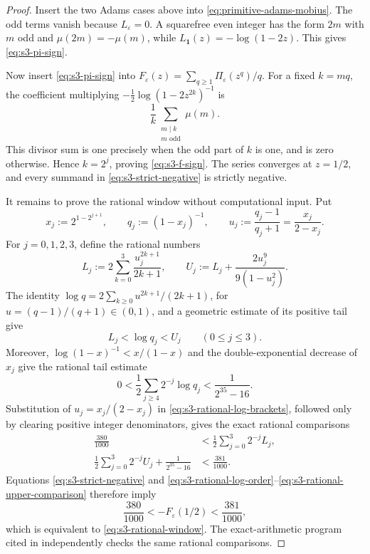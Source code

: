 \begin{proof}
Insert the two Adams cases above into
\eqref{eq:primitive-adams-mobius}.  The odd terms vanish because
\(L_\varepsilon=0\).  A squarefree even integer has the form \(2m\) with
\(m\) odd and \(\mu(2m)=-\mu(m)\), while
\(L_{\mathbf1}(z)=-\log(1-2z)\).  This gives
\eqref{eq:s3-pi-sign}.

Now insert \eqref{eq:s3-pi-sign} into
\(F_\varepsilon(z)=\sum_{q\geq1}\Pi_\varepsilon(z^q)/q\).  For a fixed
\(k=mq\), the coefficient multiplying
\(-\frac12\log(1-2z^{2k})^{-1}\) is
\[
  \frac1k\sum_{\substack{m\mid k\\m\text{ odd}}}\mu(m).
\]
This divisor sum is one precisely when the odd part of \(k\) is one, and is
zero otherwise.  Hence \(k=2^j\), proving \eqref{eq:s3-f-sign}.  The series
converges at \(z=1/2\), and every summand in
\eqref{eq:s3-strict-negative} is strictly negative.

It remains to prove the rational window without computational input.  Put
\[
 x_j:=2^{1-2^{j+1}},\qquad
 q_j:=(1-x_j)^{-1},\qquad
 u_j:=\frac{q_j-1}{q_j+1}=\frac{x_j}{2-x_j}.
\]
For \(j=0,1,2,3\), define the rational numbers
\begin{equation}\label{eq:s3-rational-log-brackets}
 L_j:=2\sum_{k=0}^{3}\frac{u_j^{2k+1}}{2k+1},
 \qquad
 U_j:=L_j+\frac{2u_j^9}{9(1-u_j^2)}.
\end{equation}
The identity
\(\log q=2\sum_{k\ge0}u^{2k+1}/(2k+1)\), for
\(u=(q-1)/(q+1)\in(0,1)\), and a geometric estimate of its positive tail give
\begin{equation}\label{eq:s3-rational-log-order}
 L_j<\log q_j<U_j\qquad(0\le j\le3).
\end{equation}
Moreover, \(\log(1-x)^{-1}<x/(1-x)\) and the double-exponential decrease of
\(x_j\) give the rational tail estimate
\begin{equation}\label{eq:s3-rational-tail}
 0<\frac12\sum_{j\ge4}2^{-j}\log q_j
   <\frac1{2^{35}-16}.
\end{equation}
Substitution of \(u_j=x_j/(2-x_j)\) in
\eqref{eq:s3-rational-log-brackets}, followed only by clearing positive
integer denominators, gives the exact rational comparisons
\begin{align}
 \frac{380}{1000}
 &<\frac12\sum_{j=0}^{3}2^{-j}L_j,
 \label{eq:s3-rational-lower-comparison}\\
 \frac12\sum_{j=0}^{3}2^{-j}U_j
   +\frac1{2^{35}-16}
 &<\frac{381}{1000}.
 \label{eq:s3-rational-upper-comparison}
\end{align}
Equations \eqref{eq:s3-strict-negative} and
\eqref{eq:s3-rational-log-order}--\eqref{eq:s3-rational-upper-comparison}
therefore imply
\[
 \frac{380}{1000}<-F_\varepsilon(1/2)<\frac{381}{1000},
\]
which is equivalent to \eqref{eq:s3-rational-window}.  The exact-arithmetic
program cited in  independently checks the same rational
comparisons.
\end{proof}

